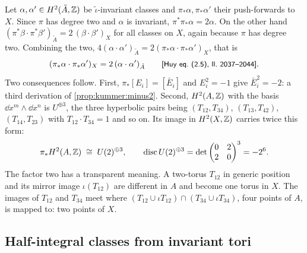 Let $\alpha,\alpha'\in H^2(\tilde A,\mathbb{Z})$ be $\tilde\iota$-invariant classes and
$\pi_*\alpha,\pi_*\alpha'$ their push-forwards to $X$. Since $\pi$ has degree two and
$\alpha$ is invariant, $\pi^*\pi_*\alpha=2\alpha$. On the other hand
$(\pi^*\beta\cdot\pi^*\beta')_{\tilde A}=2\,(\beta\cdot\beta')_X$ for all classes on $X$,
again because $\pi$ has degree two. Combining the two, $4(\alpha\cdot\alpha')_{\tilde
A}=2(\pi_*\alpha\cdot\pi_*\alpha')_X$, that is
\begin{equation}\label{eq:kummer:factor2}
  (\pi_*\alpha\cdot\pi_*\alpha')_X=2\,(\alpha\cdot\alpha')_{\tilde A}
  \qquad\text{{\small\textsf{[Huy eq.~(2.5), ll.~2037--2044]}}} .
\end{equation}
Two consequences follow. First, $\pi_*[E_i]=[\bar E_i]$ and $E_i^2=-1$ give
$\bar E_i^2=-2$: a third derivation of \cref{prop:kummer:minus2}. Second, $H^2(A,\mathbb{Z})$ with
the basis $\dd x^m\wedge\dd x^n$ is $U^{\oplus3}$, the three hyperbolic pairs being
$(T_{12},T_{34})$, $(T_{13},T_{42})$, $(T_{14},T_{23})$ with $T_{12}\cdot T_{34}=1$ and so
on. Its image in $H^2(X,\mathbb{Z})$ carries twice this form:
\begin{equation}\label{eq:kummer:U2}
  \pi_*H^2(A,\mathbb{Z})\;\cong\;U(2)^{\oplus3},\qquad
  \operatorname{disc}U(2)^{\oplus3}=\det\begin{pmatrix}0&2\\2&0\end{pmatrix}^3=-2^6 .
\end{equation}
The factor two has a transparent meaning. A two-torus $T_{12}$ in generic position and its
mirror image $\iota(T_{12})$ are different in $A$ and become one torus in $X$. The images of
$T_{12}$ and $T_{34}$ meet where $(T_{12}\cup\iota T_{12})\cap(T_{34}\cup\iota T_{34})$, four
points of $A$, is mapped to: two points of $X$.

\subsection{Half-integral classes from invariant tori}


